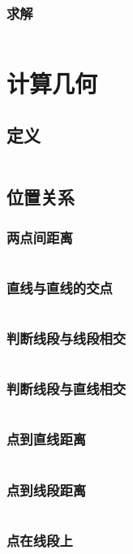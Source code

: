     \subsubsection{求解}
      \inputminted{cpp}{src/5_图论/5_欧拉回路/2_求解.cpp}
\section{计算几何}
  \subsection{定义}
    \inputminted{cpp}{src/6_计算几何/1_定义.cpp}
  \subsection{位置关系}
    \subsubsection{两点间距离}
      \inputminted{cpp}{src/6_计算几何/2_位置关系/1_两点间距离.cpp}
    \subsubsection{直线与直线的交点}
      \inputminted{cpp}{src/6_计算几何/2_位置关系/2_直线与直线的交点.cpp}
    \subsubsection{判断线段与线段相交}
      \inputminted{cpp}{src/6_计算几何/2_位置关系/3_判断线段与线段相交.cpp}
    \subsubsection{判断线段与直线相交}
      \inputminted{cpp}{src/6_计算几何/2_位置关系/4_判断线段与直线相交.cpp}
    \subsubsection{点到直线距离}
      \inputminted{cpp}{src/6_计算几何/2_位置关系/5_点到直线距离.cpp}
    \subsubsection{点到线段距离}
      \inputminted{cpp}{src/6_计算几何/2_位置关系/6_点到线段距离.cpp}
    \subsubsection{点在线段上}
      \inputminted{cpp}{src/6_计算几何/2_位置关系/7_点在线段上.cpp}
